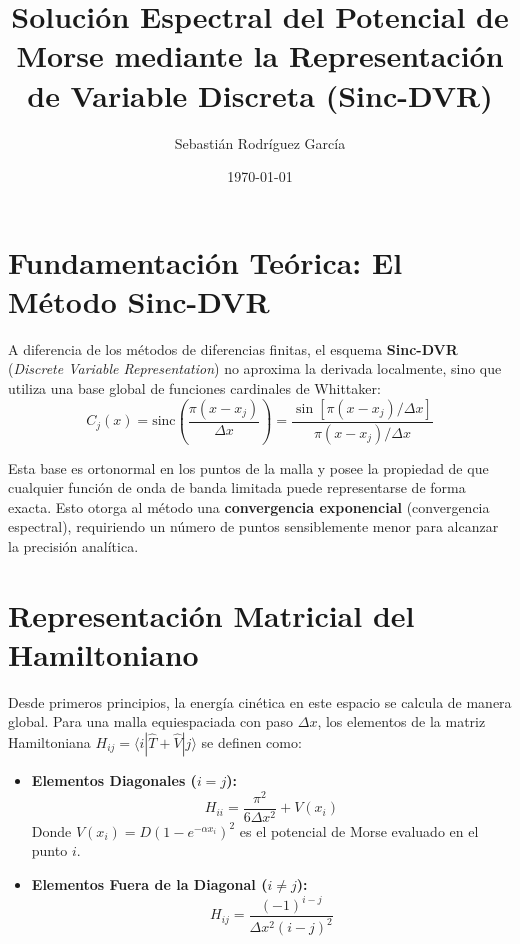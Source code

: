 \documentclass[12pt,a4paper]{article}
\title{Solución Espectral del Potencial de Morse mediante la Representación de Variable Discreta (Sinc-DVR)}
\author{Sebastián Rodríguez García}
\date{\today}
\begin{document}
\maketitle

\section{Fundamentación Teórica: El Método Sinc-DVR}
A diferencia de los métodos de diferencias finitas, el esquema \textbf{Sinc-DVR} (\textit{Discrete Variable Representation}) no aproxima la derivada localmente, sino que utiliza una base global de funciones cardinales de Whittaker:
\begin{equation}
C_j(x) = \text{sinc}\left( \frac{\pi(x-x_j)}{\Delta x} \right) = \frac{\sin[\pi(x-x_j)/\Delta x]}{\pi(x-x_j)/\Delta x}
\end{equation}

Esta base es ortonormal en los puntos de la malla y posee la propiedad de que cualquier función de onda de banda limitada puede representarse de forma exacta. Esto otorga al método una \textbf{convergencia exponencial} (convergencia espectral), requiriendo un número de puntos sensiblemente menor para alcanzar la precisión analítica.

\section{Representación Matricial del Hamiltoniano}
Desde primeros principios, la energía cinética en este espacio se calcula de manera global. Para una malla equiespaciada con paso $\Delta x$, los elementos de la matriz Hamiltoniana $H_{ij} = \langle i | \hat{T} + \hat{V} | j \rangle$ se definen como:

\begin{itemize}
    \item \textbf{Elementos Diagonales ($i = j$):}
    \begin{equation}
    H_{ii} = \frac{\pi^2}{6\Delta x^2} + V(x_i)
    \end{equation}
    Donde $V(x_i) = D(1 - e^{-\alpha x_i})^2$ es el potencial de Morse evaluado en el punto $i$.
    
    \item \textbf{Elementos Fuera de la Diagonal ($i \neq j$):}
    \begin{equation}
    H_{ij} = \frac{(-1)^{i-j}}{\Delta x^2 (i-j)^2}
    \end{equation}
\end{itemize}
\end{document}
